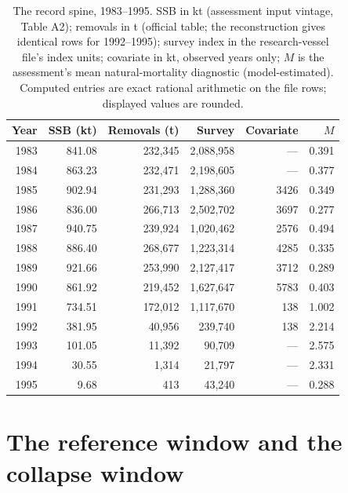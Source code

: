 \documentclass[10pt,twocolumn]{article}
\theoremstyle{plain}
\theoremstyle{remark}
\begin{document}
\begin{table}[t]
\centering
\scriptsize
\setlength{\tabcolsep}{2.8pt}
\caption{The record spine, 1983--1995. SSB in kt (assessment input
vintage, Table A2); removals in t (official table; the reconstruction
gives identical rows for 1992--1995); survey index in the
research-vessel file's index units; covariate in kt, observed years
only; \(M\) is the assessment's mean natural-mortality diagnostic
(model-estimated). Computed entries are exact rational arithmetic on
the file rows; displayed values are rounded.}
\label{tab:spine}
\begin{tabular}{@{}r r r r r r@{}}
\toprule
Year & SSB (kt) & Removals (t) & Survey & Covariate & \(M\) \\
\midrule
1983 & 841.08 & 232{,}345 & 2{,}088{,}958 & --- & 0.391 \\
1984 & 863.23 & 232{,}471 & 2{,}198{,}605 & --- & 0.377 \\
1985 & 902.94 & 231{,}293 & 1{,}288{,}360 & 3426 & 0.349 \\
1986 & 836.00 & 266{,}713 & 2{,}502{,}702 & 3697 & 0.277 \\
1987 & 940.75 & 239{,}924 & 1{,}020{,}462 & 2576 & 0.494 \\
1988 & 886.40 & 268{,}677 & 1{,}223{,}314 & 4285 & 0.335 \\
1989 & 921.66 & 253{,}990 & 2{,}127{,}417 & 3712 & 0.289 \\
1990 & 861.92 & 219{,}452 & 1{,}627{,}647 & 5783 & 0.403 \\
1991 & 734.51 & 172{,}012 & 1{,}117{,}670 & 138 & 1.002 \\
1992 & 381.95 & 40{,}956 & 239{,}740 & 138 & 2.214 \\
1993 & 101.05 & 11{,}392 & 90{,}709 & --- & 2.575 \\
1994 & 30.55 & 1{,}314 & 21{,}797 & --- & 2.331 \\
1995 & 9.68 & 413 & 43{,}240 & --- & 0.288 \\
\bottomrule
\end{tabular}
\end{table}

\section{The reference window and the collapse window}\label{windows}
\end{document}
